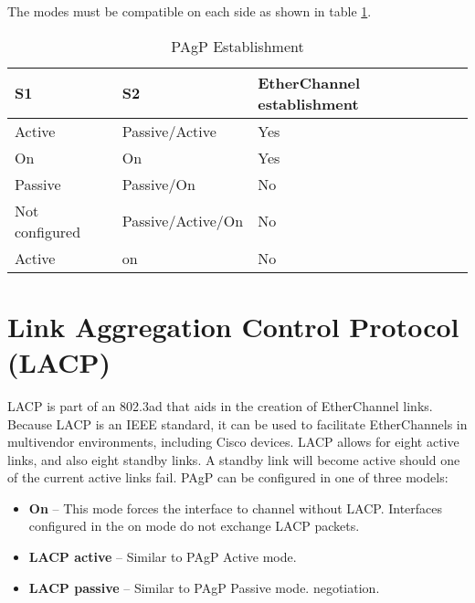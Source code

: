 The modes must be compatible on each side as shown in table \ref{PAgP-mode}.

\begin{table}[htbp]
\caption{PAgP Establishment}
\label{PAgP-mode}
\begin{tabular}{|l|l|l|}
\hline
S1             & S2                & EtherChannel establishment \\ \hline
Active      & Passive/Active    & Yes                        \\ \hline
On             & On                & Yes                        \\ \hline
Passive           & Passive/On           & No                         \\ \hline
Not configured & Passive/Active/On & No                         \\ \hline
Active      & on                & No                         \\ \hline
\end{tabular}
\end{table}

\section{Link Aggregation Control Protocol (LACP)}

LACP is part of an 802.3ad that aids in the  creation of EtherChannel links. Because LACP is an IEEE standard, it can be used to facilitate EtherChannels in multivendor environments, including Cisco devices. LACP allows for eight active links, and also eight standby links. A standby link will become active should one of the current active links fail. PAgP can be configured in one of three models:

\begin{itemize}
\item \textbf{On} -- This mode forces the interface to channel without LACP. Interfaces configured in the on mode do not exchange LACP packets.
\item \textbf{LACP active} -- Similar to PAgP Active mode.
\item \textbf{LACP passive} -- Similar to PAgP Passive mode. negotiation.
\end{itemize}

